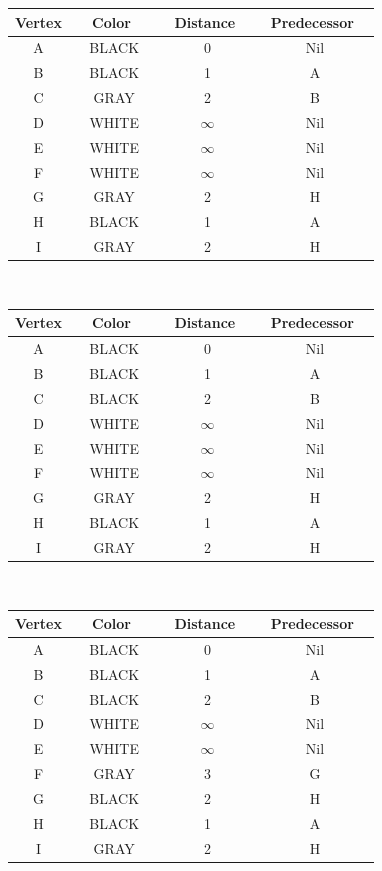 \documentclass[12pt]{article}
\newcommand{\vs}{\vspace{2mm}}
\newcommand{\hs}{\hspace{10mm}}
\newcommand{\ha}{\hspace{1mm}}
\begin{document}

\begin{tabular}{|c|c|c|c|} \hline
  Vertex  & \hs\ \ha\  Color \hs\ \ha\ & \hs\  Distance \hs\ & \ha\ Predecessor \ha\  \\ \hline
  A & BLACK & 0 & Nil \\ \hline
  B & BLACK & 1 & A \\ \hline
  C & GRAY & 2 & B \\ \hline
  D & WHITE & $\infty$ & Nil \\ \hline
  E & WHITE & $\infty$ & Nil \\ \hline
  F & WHITE & $\infty$ & Nil \\ \hline
  G & GRAY & 2 & H \\ \hline
  H & BLACK & 1 & A \\ \hline
  I & GRAY & 2 & H \\ \hline
\end{tabular}
\vs\


\begin{tabular}{|c|c|c|c|} \hline
  Vertex  & \hs\ \ha\  Color \hs\ \ha\ & \hs\  Distance \hs\ & \ha\ Predecessor \ha\  \\ \hline
  A & BLACK & 0 & Nil \\ \hline
  B & BLACK & 1 & A \\ \hline
  C & BLACK & 2 & B \\ \hline
  D & WHITE & $\infty$ & Nil \\ \hline
  E & WHITE & $\infty$ & Nil \\ \hline
  F & WHITE & $\infty$ & Nil \\ \hline
  G & GRAY & 2 & H \\ \hline
  H & BLACK & 1 & A \\ \hline
  I & GRAY & 2 & H \\ \hline
\end{tabular}
\vs\


\begin{tabular}{|c|c|c|c|} \hline
  Vertex  & \hs\ \ha\  Color \hs\ \ha\ & \hs\  Distance \hs\ & \ha\ Predecessor \ha\  \\ \hline
  A & BLACK & 0 & Nil \\ \hline
  B & BLACK & 1 & A \\ \hline
  C & BLACK & 2 & B \\ \hline
  D & WHITE & $\infty$ & Nil \\ \hline
  E & WHITE & $\infty$ & Nil \\ \hline
  F & GRAY & 3 & G \\ \hline
  G & BLACK & 2 & H \\ \hline
  H & BLACK & 1 & A \\ \hline
  I & GRAY & 2 & H \\ \hline
\end{tabular}
\vs\
\end{document}
